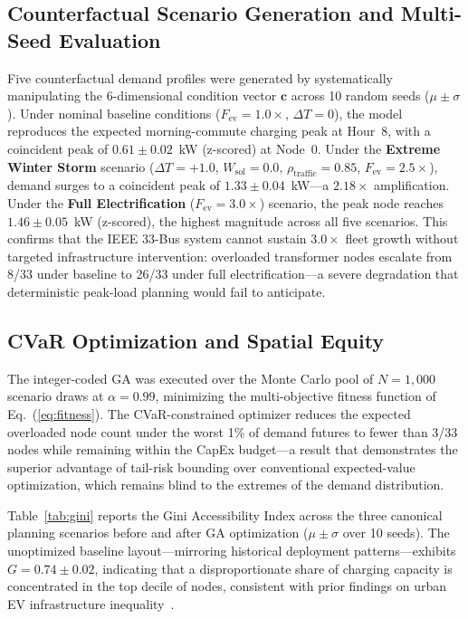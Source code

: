 \documentclass[conference]{IEEEtran}
\begin{document}
\subsection{Counterfactual Scenario Generation and Multi-Seed Evaluation}

Five counterfactual demand profiles were generated by systematically manipulating the 6-dimensional condition vector $\mathbf{c}$ across 10 random seeds ($\mu \pm \sigma$). Under nominal baseline conditions ($F_{\text{ev}} = 1.0\times$, $\Delta T = 0$), the model reproduces the expected morning-commute charging peak at Hour~8, with a coincident peak of $0.61 \pm 0.02$~kW (z-scored) at Node~0. Under the \textbf{Extreme Winter Storm} scenario ($\Delta T = +1.0$, $W_{\text{sol}} = 0.0$, $\rho_{\text{traffic}} = 0.85$, $F_{\text{ev}} = 2.5\times$), demand surges to a coincident peak of $1.33 \pm 0.04$~kW---a $2.18\times$ amplification. Under the \textbf{Full Electrification} ($F_{\text{ev}} = 3.0\times$) scenario, the peak node reaches $1.46 \pm 0.05$~kW (z-scored), the highest magnitude across all five scenarios. This confirms that the IEEE 33-Bus system cannot sustain $3.0\times$ fleet growth without targeted infrastructure intervention: overloaded transformer nodes escalate from 8/33 under baseline to 26/33 under full electrification---a severe degradation that deterministic peak-load planning would fail to anticipate.

\subsection{CVaR Optimization and Spatial Equity}

The integer-coded GA was executed over the Monte Carlo pool of $N = 1{,}000$ scenario draws at $\alpha = 0.99$, minimizing the multi-objective fitness function of Eq.~(\ref{eq:fitness}). The CVaR-constrained optimizer reduces the expected overloaded node count under the worst 1\% of demand futures to fewer than 3/33 nodes while remaining within the CapEx budget---a result that demonstrates the superior advantage of tail-risk bounding over conventional expected-value optimization, which remains blind to the extremes of the demand distribution.

Table~\ref{tab:gini} reports the Gini Accessibility Index across the three canonical planning scenarios before and after GA optimization ($\mu \pm \sigma$ over 10 seeds). The unoptimized baseline layout---mirroring historical deployment patterns---exhibits $G = 0.74 \pm 0.02$, indicating that a disproportionate share of charging capacity is concentrated in the top decile of nodes, consistent with prior findings on urban EV infrastructure inequality~\cite{ref4}.
\end{document}
